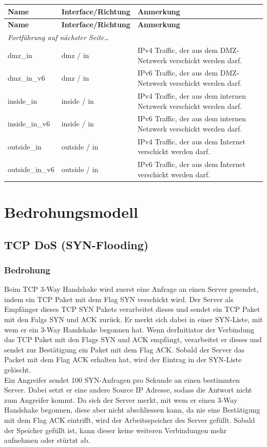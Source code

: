 \documentclass[11pt,a4paper,parskip=half]{scrartcl}
\begin{document}
\begin{longtable}{p{2.5cm}|p{3.5cm}|p{7cm}}
	\textbf{Name} & \textbf{Interface/Richtung} & \textbf{Anmerkung}\\
	\hline
	\endfirsthead
	\textbf{Name} & \textbf{Interface/Richtung} & \textbf{Anmerkung}\\
	\hline
	\endhead
	\hline
	\multicolumn{2}{l}{\textit{Fortführung auf nächster Seite\ldots}} \\
	\endfoot
	\endlastfoot
	dmz\_in & dmz / in & IPv4 Traffic, der aus dem DMZ-Netzwerk verschickt werden darf.\\
	dmz\_in\_v6 & dmz / in & IPv6 Traffic, der aus dem DMZ-Netzwerk verschickt werden darf.\\
	inside\_in  & inside / in & IPv4 Traffic, der aus dem internen Netzwerk verschickt werden darf.\\
	inside\_in\_v6 & inside / in & IPv6 Traffic, der aus dem internen Netzwerk verschickt werden darf.\\
	outside\_in & outside / in & IPv4 Traffic, der aus dem Internet verschickt werden darf.\\
	outside\_in\_v6 & outside / in & IPv6 Traffic, der aus dem Internet verschickt werden darf.\\
\end{longtable}

\section{Bedrohungsmodell}
\subsection{TCP DoS (SYN-Flooding)}
\subsubsection{Bedrohung}
Beim TCP 3-Way Handshake wird zuerst eine Anfrage an einen Server gesendet, indem ein TCP Paket mit dem Flag SYN verschickt wird. Der Server als Empfänger dieses TCP SYN Pakets verarbeitet dieses und sendet ein TCP Paket mit den Falgs SYN und ACK zurück. Er merkt sich dabei in einer SYN-Liste, mit wem er ein 3-Way Handshake begonnen hat. Wenn derInitiator der Verbindung das TCP Paket mit den Flags SYN und ACK empfängt, verarbeitet er dieses und sendet zur Bestätigung ein Paket mit dem Flag ACK. Sobald der Server das Packet mit dem Flag ACK erhalten hat, wird der Eintrag in der SYN-Liste gelöscht.\\
Ein Angreifer sendet 100 SYN-Anfragen pro Sekunde an einen bestimmten Server. Dabei setzt er eine andere Source IP Adresse, sodass die Antwort nicht zum Angreifer kommt. Da sich der Server merkt, mit wem er einen 3-Way Handshake begonnen, diese aber nicht abschliessen kann, da nie eine Bestätigung mit dem Flag ACK eintrifft, wird der Arbeitsspeicher des Server gefüllt. Sobald der Speicher gefüllt ist, kann dieser keine weiteren Verbindungen mehr aufnehmen oder stürtzt ab.
\end{document}
